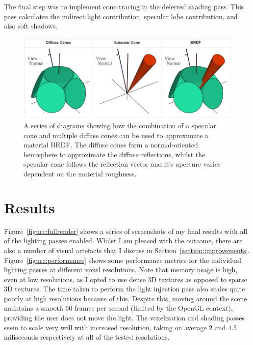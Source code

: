 \documentclass[]{acmsiggraph}
\begin{document}
The final step was to implement cone tracing in the deferred shading pass. This pass calculates the indirect light contribution, specular lobe contribution, and also soft shadows.

\begin{figure}[htbp]\centering
 \includegraphics[width=1.0\linewidth]{images/BRDF}
 \caption{A series of diagrams showing how the combination of a specular cone and multiple diffuse cones can be used to approximate a material BRDF. \protect\cite{Villegas2016} The diffuse cones form a normal-oriented hemisphere to approximate the diffuse reflections, whilst the specular cone follows the reflection vector and it's aperture varies dependent on the material roughness.}
\end{figure}

\section{Results}

Figure~\ref{figure:fullrender} shows a series of screenshots of my final results with all of the lighting passes enabled. Whilst I am pleased with the outcome, there are also a number of visual artefacts that I discuss in Section~\ref{section:improvements}. Figure~\ref{figure:performance} shows some performance metrics for the individual lighting passes at different voxel resolutions. Note that memory usage is high, even at low resolutions, as I opted to use dense 3D textures as opposed to sparse 3D textures. The time taken to perform the light injection pass also scales quite poorly at high resolutions because of this. Despite this, moving around the scene maintains a smooth 60 frames per second (limited by the OpenGL context), providing the user does not move the light. The voxelization and shading passes seem to scale very well with increased resolution, taking on average 2 and 4.5 miliseconds respectively at all of the tested resolutions.
\end{document}
